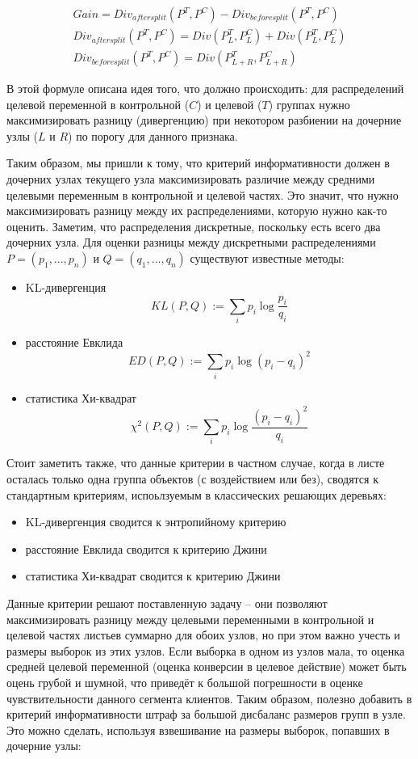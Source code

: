 \begin{gather*}
    Gain = Div_{after split}(P^T, P^C) - Div_{before split}(P^T, P^C) \\
    Div_{after split}(P^T, P^C) = Div(P^T_L, P^C_L) + Div(P^T_L, P^C_L) \\
    Div_{before split}(P^T, P^C) = Div(P^T_{L+R}, P^C_{L+R})
\end{gather*}

В этой формуле описана идея того, что должно происходить: для распределений целевой переменной в контрольной ($C$) и целевой ($T$) группах нужно максимизировать разницу (дивергенцию) при некотором разбиении на дочерние узлы ($L$ и $R$) по порогу для данного признака.

Таким образом, мы пришли к тому, что критерий информативности должен в дочерних узлах текущего узла максимизировать различие между средними целевыми переменным в контрольной и целевой частях. Это значит, что нужно максимизировать разницу между их распределениями, которую нужно как-то оценить. Заметим, что распределения дискретные, поскольку есть всего два дочерних узла. Для оценки разницы между дискретными распределениями $P = (p_1, ..., p_n)$ и $Q = (q_1, ..., q_n)$ существуют известные методы:
\begin{itemize}
    \item KL-дивергенция
        $$
            KL(P, Q) := \sum\limits_{i} p_i \log \frac{p_i}{q_i}
        $$
    \item расстояние Евклида
        $$
            ED(P, Q) := \sum\limits_{i} p_i \log (p_i - q_i)^2
        $$
    \item статистика Хи-квадрат
        $$
            \chi^2(P, Q) := \sum\limits_{i} p_i \log \frac{(p_i - q_i)^2}{q_i}
        $$
\end{itemize}

Стоит заметить также, что данные критерии в частном случае, когда в листе осталась только одна группа объектов (с воздействием или без), сводятся к стандартным критериям, испоьлзуемым в классических решающих деревьях:
\begin{itemize}
    \item KL-дивергенция сводится к энтропийному критерию
    \item расстояние Евклида сводится к критерию Джини
    \item статистика Хи-квадрат сводится к критерию Джини
\end{itemize}

Данные критерии решают поставленную задачу -- они позволяют максимизировать разницу между целевыми переменными в контрольной и целевой частях листьев суммарно для обоих узлов, но при этом важно учесть и размеры выборок из этих узлов. Если выборка в одном из узлов мала, то оценка средней целевой переменной (оценка конверсии в целевое действие) может быть оцень грубой и шумной, что приведёт к большой погрешности в оценке чувствительности данного сегмента клиентов. Таким образом, полезно добавить в критерий информативности штраф за большой дисбаланс размеров групп в узле. Это можно сделать, используя взвешивание на размеры выборок, попавших в дочерние узлы:

